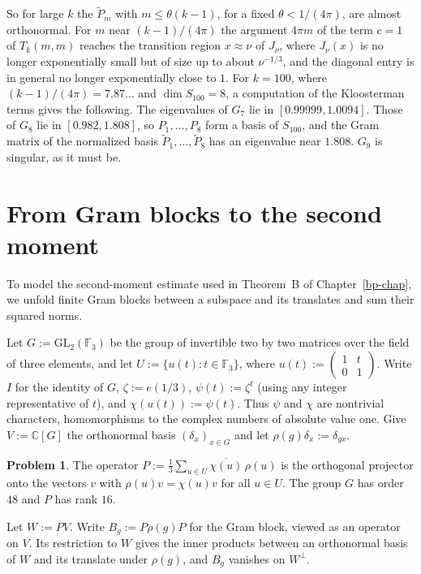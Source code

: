 \documentclass[reqno]{amsart}
\newcounter{chap}
\theoremstyle{definition}
\newtheorem{problem}{Problem}[section]
\theoremstyle{plain}
\newcommand{\C}{\mathbb{C}}
\newcommand{\Pt}{\widetilde{P}}
\begin{document}
So for large \(k\) the \(\Pt_m\) with \(m \le \theta(k-1)\), for a fixed \(\theta < 1/(4\pi)\), are almost orthonormal.  For \(m\) near \((k-1)/(4\pi)\) the argument \(4\pi m\) of the term \(c = 1\) of \(T_k(m,m)\) reaches the transition region \(x \approx \nu\) of \(J_\nu\), where \(J_\nu(x)\) is no longer exponentially small but of size up to about \(\nu^{-1/3}\), and the diagonal entry is in general no longer exponentially close to \(1\).  For \(k = 100\), where \((k-1)/(4\pi) = 7.87\ldots\) and \(\dim S_{100} = 8\), a computation of the Kloosterman terms gives the following.  The eigenvalues of \(G_7\) lie in \([0.99999, 1.0094]\).  Those of \(G_8\) lie in \([0.982, 1.808]\), so \(P_1,\dots,P_8\) form a basis of \(S_{100}\), and the Gram matrix of the normalized basis \(\Pt_1,\dots,\Pt_8\) has an eigenvalue near \(1.808\).  \(G_9\) is singular, as it must be.

\section{From Gram blocks to the second moment}\label{sec:finite-moment}

To model the second-moment estimate used in Theorem~B of Chapter~\ref{bp-chap}, we unfold finite Gram blocks between a subspace and its translates and sum their squared norms.

Let \(G:=\mathrm{GL}_2(\mathbb{F}_3)\) be the group of invertible two by two matrices over the field of three elements, and let \(U:=\{u(t):t\in\mathbb{F}_3\}\), where \(u(t):=\begin{pmatrix}1&t\\0&1\end{pmatrix}\).  Write \(I\) for the identity of \(G\), \(\zeta:=e(1/3)\), \(\psi(t):=\zeta^t\) (using any integer representative of \(t\)), and \(\chi(u(t)):=\psi(t)\).  Thus \(\psi\) and \(\chi\) are nontrivial characters, homomorphisms to the complex numbers of absolute value one.  Give \(V:=\C[G]\) the orthonormal basis \((\delta_x)_{x\in G}\) and let \(\rho(g)\delta_x:=\delta_{gx}\).

\begin{problem}\label{pr:finite-projector}
The operator \(P:=\frac13\sum_{u\in U}\overline{\chi(u)}\,\rho(u)\) is the orthogonal projector onto the vectors \(v\) with \(\rho(u)v=\chi(u)v\) for all \(u\in U\).  The group \(G\) has order \(48\) and \(P\) has rank \(16\).
\end{problem}

Let \(W:=PV\).  Write \(B_g:=P\rho(g)P\) for the Gram block, viewed as an operator on \(V\).  Its restriction to \(W\) gives the inner products between an orthonormal basis of \(W\) and its translate under \(\rho(g)\), and \(B_g\) vanishes on \(W^\perp\).
\end{document}

